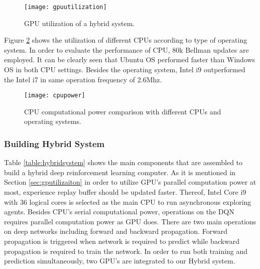 \documentclass{ituphdreport}
\begin{document}
\begin{figure}[h]
	\begin{center}
		\texttt{[image: gpuutilization]}
	\end{center}
	\caption{GPU utilization of a hybrid system.
		\label{fig:gpuutilization}}
\end{figure}


Figure \ref{fig:cpupower} shows the utilization of different CPUs according to type of operating system. In order to evaluate the performance of CPU, 80k Bellman updates are employed. It can be clearly seen that Ubuntu OS performed faster than Windows OS in both CPU settings. Besides the operating system, Intel i9 outperformed the Intel i7 in same operation frequency of 2.6Mhz.
\begin{figure}[h]
	\begin{center}
		\texttt{[image: cpupower]}
	\end{center}
	\caption{CPU computational power comparison with different CPUs and operating systems.
		\label{fig:cpupower}}
\end{figure}


\iffalse
\subsubsection{Multi Processing vs Multi Threading} \label{sec:processvsthread}
Lorem ipsum dolor sit amet, consectetur adipiscing elit, sed do eiusmod tempor incididunt ut labore et dolore magna aliqua. Ut enim ad minim veniam, quis nostrud exercitation ullamco laboris nisi ut aliquip ex ea commodo consequat. Duis aute irure dolor in reprehenderit in voluptate velit esse cillum dolore eu fugiat nulla pariatur. Excepteur sint occaecat cupidatat non proident, sunt in culpa qui officia deserunt mollit anim id est laborum.
\fi

\subsubsection{Building Hybrid System} \label{sec:buildinghybrid}
Table \ref{table:hybridsystem} shows the main components that are assembled to build a hybrid deep reinforcement learning computer. As it is mentioned in Section \ref{sec:gputilizaiton} in order to utilize GPU's parallel computation power at most, experience replay buffer should be updated faster. Thereof, Intel Core i9 with 36 logical cores is selected as the main CPU to run asynchronous exploring agents. Besides CPU's serial computational power, operations on the DQN requires parallel computation power as GPU does. There are two main operations on deep networks including forward and backward propagation. Forward propagation is triggered when network is required to predict while backward propagation is required to train the network. In order to run both training and prediction simultaneously, two GPU's are integrated to our Hybrid system. 
 
\end{document}
